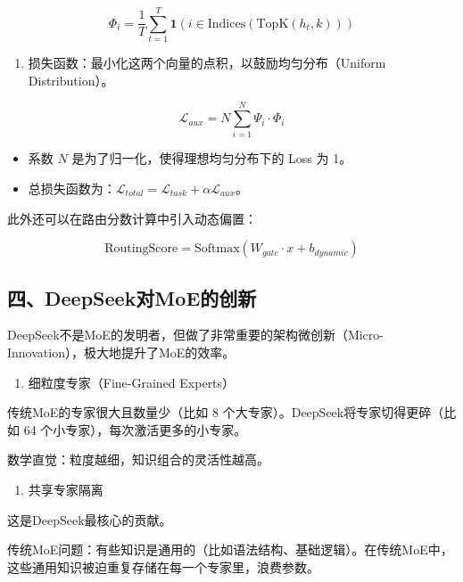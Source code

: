 \[
\Phi_i = \frac{1}{T}\sum_{t=1}^{T}\mathbf{1}\left(i \in \mathrm{Indices}(\mathrm{TopK}(h_t,k))\right)
\]

\begin{enumerate}
\def\labelenumi{\arabic{enumi}.}
\setcounter{enumi}{2}
\tightlist
\item
  损失函数：最小化这两个向量的点积，以鼓励均匀分布（Uniform Distribution）。
\end{enumerate}

\[
\mathcal{L}_{aux} = N\sum_{i=1}^{N}\Psi_i \cdot \Phi_i
\]

\begin{itemize}
\tightlist
\item
  系数 \(N\) 是为了归一化，使得理想均匀分布下的 Loss 为 1。
\item
  总损失函数为：\(\mathcal{L}_{total}=\mathcal{L}_{task}+\alpha\mathcal{L}_{aux}\)。
\end{itemize}

此外还可以在路由分数计算中引入动态偏置：

\[
\mathrm{RoutingScore}=\mathrm{Softmax}(W_{gate}\cdot x+b_{dynamic})
\]

\hypertarget{ux56dbdeepseekux5bf9moeux7684ux521bux65b0}{%
\subsection{四、DeepSeek对MoE的创新}\label{ux56dbdeepseekux5bf9moeux7684ux521bux65b0}}

DeepSeek不是MoE的发明者，但做了非常重要的架构微创新（Micro-Innovation），极大地提升了MoE的效率。

\begin{enumerate}
\def\labelenumi{\arabic{enumi}.}
\tightlist
\item
  细粒度专家（Fine-Grained Experts）
\end{enumerate}

传统MoE的专家很大且数量少（比如 8 个大专家）。DeepSeek将专家切得更碎（比如 64 个小专家），每次激活更多的小专家。

数学直觉：粒度越细，知识组合的灵活性越高。

\begin{enumerate}
\def\labelenumi{\arabic{enumi}.}
\setcounter{enumi}{1}
\tightlist
\item
  共享专家隔离
\end{enumerate}

这是DeepSeek最核心的贡献。

传统MoE问题：有些知识是通用的（比如语法结构、基础逻辑）。在传统MoE中，这些通用知识被迫重复存储在每一个专家里，浪费参数。

